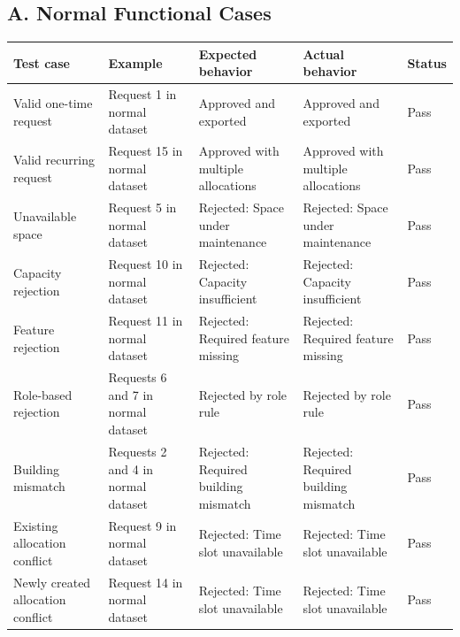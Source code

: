 \documentclass[12pt,a4paper]{article}
\begin{document}
\subsection*{A. Normal Functional Cases}
\begin{center}
\footnotesize
\begin{tabularx}{\textwidth}{@{} p{3.0cm} p{2.9cm} X X p{1.1cm} @{}}
\toprule
\textbf{Test case} & \textbf{Example} & \textbf{Expected behavior} & \textbf{Actual behavior} & \textbf{Status} \\
\midrule
Valid one-time request & Request 1 in normal dataset & Approved and exported & Approved and exported & Pass \\
Valid recurring request & Request 15 in normal dataset & Approved with multiple allocations & Approved with multiple allocations & Pass \\
Unavailable space & Request 5 in normal dataset & Rejected: Space under maintenance & Rejected: Space under maintenance & Pass \\
Capacity rejection & Request 10 in normal dataset & Rejected: Capacity insufficient & Rejected: Capacity insufficient & Pass \\
Feature rejection & Request 11 in normal dataset & Rejected: Required feature missing & Rejected: Required feature missing & Pass \\
Role-based rejection & Requests 6 and 7 in normal dataset & Rejected by role rule & Rejected by role rule & Pass \\
Building mismatch & Requests 2 and 4 in normal dataset & Rejected: Required building mismatch & Rejected: Required building mismatch & Pass \\
Existing allocation conflict & Request 9 in normal dataset & Rejected: Time slot unavailable & Rejected: Time slot unavailable & Pass \\
Newly created allocation conflict & Request 14 in normal dataset & Rejected: Time slot unavailable & Rejected: Time slot unavailable & Pass \\
\bottomrule
\end{tabularx}
\end{center}
\normalsize

\end{document}
